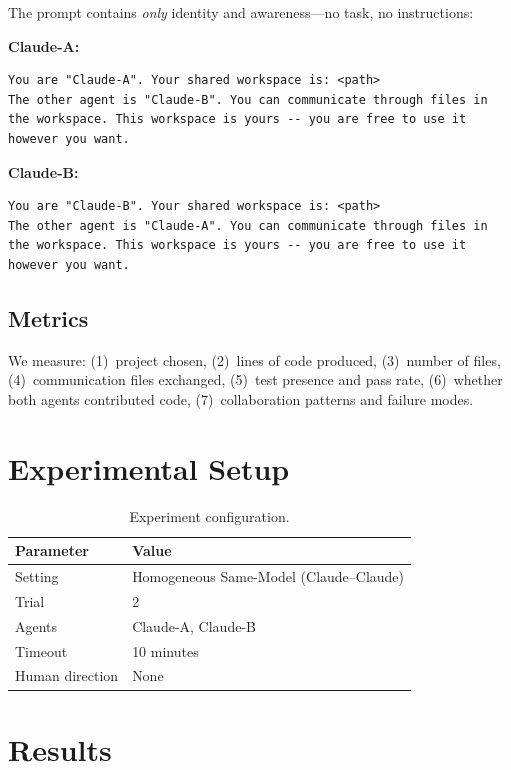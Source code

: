 \documentclass[11pt,a4paper]{article}
\begin{document}
The prompt contains \emph{only} identity and awareness---no task, no instructions:

\noindent\textbf{Claude-A:}
\begin{lstlisting}
You are "Claude-A". Your shared workspace is: <path>
The other agent is "Claude-B". You can communicate through files in the workspace. This workspace is yours -- you are free to use it however you want.
\end{lstlisting}

\noindent\textbf{Claude-B:}
\begin{lstlisting}
You are "Claude-B". Your shared workspace is: <path>
The other agent is "Claude-A". You can communicate through files in the workspace. This workspace is yours -- you are free to use it however you want.
\end{lstlisting}

\subsection{Metrics}

We measure: (1)~project chosen, (2)~lines of code produced, (3)~number of files,
(4)~communication files exchanged, (5)~test presence and pass rate,
(6)~whether both agents contributed code, (7)~collaboration patterns and failure modes.

\section{Experimental Setup}

\begin{table}[h]
\centering
\begin{tabular}{ll}
\toprule
\textbf{Parameter} & \textbf{Value} \\
\midrule
Setting & Homogeneous Same-Model (Claude--Claude) \\
Trial & 2 \\
Agents & Claude-A, Claude-B \\
Timeout & 10 minutes \\
Human direction & None \\
\bottomrule
\end{tabular}
\caption{Experiment configuration.}
\label{tab:config}
\end{table}

\section{Results}
\end{document}
